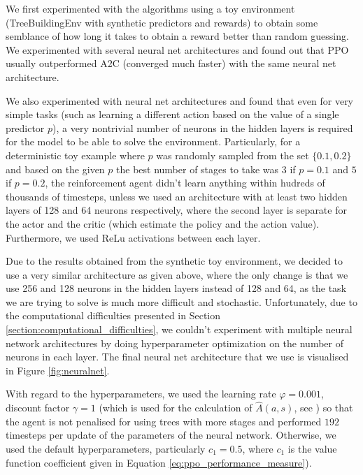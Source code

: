 We first experimented with the algorithms using a toy environment (TreeBuildingEnv with synthetic predictors and rewards) to obtain some semblance of how long it takes to obtain a reward better than random guessing. We experimented with several neural net architectures and found out that PPO usually outperformed A2C (converged much faster) with the same neural net architecture. 

We also experimented with neural net architectures and found that even for very simple tasks (such as learning a different action based on the value of a single predictor $p$), a very nontrivial number of neurons in the hidden layers is required for the model to be able to solve the environment. Particularly, for a deterministic toy example where $p$ was randomly sampled from the set $\{0.1, 0.2\}$ and based on the given $p$ the best number of stages to take was $3$ if $p=0.1$ and $5$ if $p=0.2$, the reinforcement agent didn't learn anything within hudreds of thousands of timesteps, unless we used an architecture with at least two hidden layers of 128 and 64 neurons respectively, where the second layer is separate for the actor and the critic (which estimate the policy and the action value). Furthermore, we used ReLu activations between each layer. 

Due to the results obtained from the synthetic toy environment, we decided to use a very similar architecture as given above, where the only change is that we use 256 and 128 neurons in the hidden layers instead of 128 and 64, as the task we are trying to solve is much more difficult and stochastic. Unfortunately, due to the computational difficulties presented in Section \ref{section:computational_difficulties}, we couldn't experiment with multiple neural network architectures by doing hyperparameter optimization on the number of neurons in each layer. The final neural net architecture that we use is visualised in Figure \ref{fig:neuralnet}. 


With regard to the hyperparameters, we used the learning rate $\varphi=0.001$, discount factor $\gamma=1$ (which is used for the calculation of $\widehat{A}(a,s)$, see \cite[Section 5]{proximal_policy_optimization}) so that the agent is not penalised for using trees with more stages and performed $192$ timesteps per update of the parameters of the neural network. Otherwise, we used the default hyperparameters, particularly $c_1=0.5$, where $c_1$ is the value function coefficient given in Equation \ref{eq:ppo_performance_measure}).

